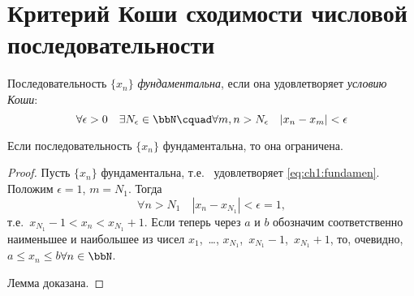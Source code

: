 \section{Критерий Коши сходимости числовой последовательности}

\begin{defn}
Последовательность $\{x_n\}$ \textit{фундаментальна}, если она удовлетворяет \textit{условию Коши}:
\begin{equation}
\label{eq:ch1:fundamen}
\forall \epsilon >0 \quad \exists N_{\epsilon} \in \bbN\cquad \forall m,n > N_{\epsilon}\quad |x_n-x_m|<\epsilon  
\end{equation}
\end{defn}

\begin{lemm}
\label{lm:ch1:fundamendal}
Если последовательность $\{x_n\}$ фундаментальна, то она ограничена.
\end{lemm}
\begin{proof}
Пусть $\{x_n\}$ фундаментальна, т.е.~ удовлетворяет \eqref{eq:ch1:fundamen}. Положим $\epsilon = 1$, $m = N_1$. Тогда $$
\forall n > N_1\quad |x_n-x_{N_1}| <\epsilon = 1,
$$ 
т.е.~$x_{N_1} - 1< x_n < x_{N_1}+1$. Если теперь через $a$ и $b$ обозначим соответственно наименьшее и наибольшее из чисел $x_1$,~\dots, $x_{N_1}$,~$x_{N_1}-1$,~$x_{N_1}+1$, то, очевидно, $a \le x_n \le b$\quad$\forall n \in \bbN$.

Лемма доказана.
\end{proof}

